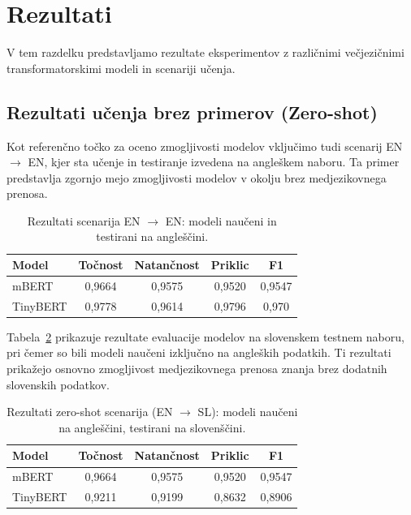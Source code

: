 \documentclass[sigconf,nonacm]{acmart}
\begin{document}
\section{Rezultati}

V tem razdelku predstavljamo rezultate eksperimentov z različnimi večjezičnimi transformatorskimi modeli in scenariji učenja.

\subsection{Rezultati učenja brez primerov (Zero-shot)}

Kot referenčno točko za oceno zmogljivosti modelov vključimo tudi scenarij EN $\rightarrow$ EN, kjer sta učenje in testiranje izvedena na angleškem naboru. Ta primer predstavlja zgornjo mejo zmogljivosti modelov v okolju brez medjezikovnega prenosa.

\begin{table}[h]
\centering
\caption{Rezultati scenarija EN $\rightarrow$ EN: modeli naučeni in testirani na angleščini.}
\label{tab:english_in_language}
\begin{tabular}{lcccc}
\toprule
\textbf{Model} & \textbf{Točnost} & \textbf{Natančnost} & \textbf{Priklic} & \textbf{F1} \\
\midrule
mBERT & 0,9664 & 0,9575 & 0,9520 & 0,9547 \\
TinyBERT & 0,9778 & 0,9614 & 0,9796 & 0,970 \\
\bottomrule
\end{tabular}
\end{table}

Tabela~\ref{tab:zero_shot} prikazuje rezultate evaluacije modelov na slovenskem testnem naboru, pri čemer so bili modeli naučeni izključno na angleških podatkih. Ti rezultati prikažejo osnovno zmogljivost medjezikovnega prenosa znanja brez dodatnih slovenskih podatkov.

\begin{table}[h]
\centering
\caption{Rezultati zero-shot scenarija (EN $\rightarrow$ SL): modeli naučeni na angleščini, testirani na slovenščini.}
\label{tab:zero_shot}
\begin{tabular}{lcccc}
\toprule
\textbf{Model} & \textbf{Točnost} & \textbf{Natančnost} & \textbf{Priklic} & \textbf{F1} \\
\midrule
mBERT & 0,9664 & 0,9575 & 0,9520 & 0,9547 \\
TinyBERT & 0,9211 & 0,9199 & 0,8632 & 0,8906 \\
\bottomrule
\end{tabular}
\end{table}
\end{document}
